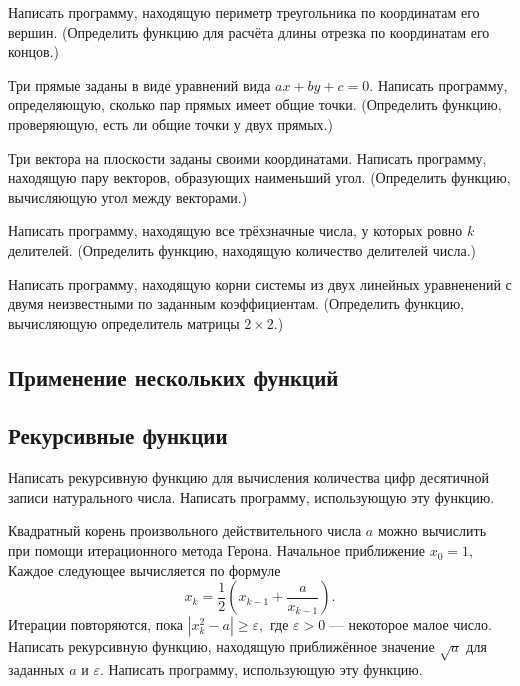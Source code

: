 \task Написать программу, находящую периметр треугольника по
координатам его вершин. (Определить функцию для расчёта длины отрезка
по координатам его концов.)

\task Три прямые заданы в виде уравнений вида $ax+by+c=0$. Написать
программу, определяющую, сколько пар прямых имеет общие
точки. (Определить функцию, проверяющую, есть ли общие точки у двух
прямых.)

\task Три вектора на плоскости заданы своими координатами. Написать
программу, находящую пару векторов, образующих наименьший
угол. (Определить функцию, вычисляющую угол между векторами.)

\task Написать программу, находящую все трёхзначные числа, у которых
ровно $k$ делителей. (Определить функцию, находящую количество
делителей числа.)

\task Написать программу, находящую корни системы из двух линейных
уравненений с двумя неизвестными по заданным
коэффициентам. (Определить функцию, вычисляющую определитель матрицы
$2\times 2$.)

\subsection{Применение нескольких функций}

\task

\task

\task

\task

\task

\task

\task

\task

\task

\task

\subsection{Рекурсивные функции}

\task Написать рекурсивную функцию для вычисления количества цифр
десятичной записи натурального числа. Написать программу, использующую
эту функцию.

\task Квадратный корень произвольного действительного числа $a$ можно
вычислить при помощи итерационного метода Герона. Начальное
приближение $x_0 = 1,$ Каждое следующее вычисляется по формуле
\[
x_k = \frac12 \left( x_{k-1} + \frac{a}{x_{k-1}} \right).
\]
Итерации повторяются, пока $\left| x_k^2 - a \right| \geqslant
\varepsilon,$ где $\varepsilon > 0$ — некоторое малое число.  Написать
рекурсивную функцию, находящую приближённое значение $\sqrt{a}$ для
заданных $a$ и $\varepsilon.$ Написать программу, использующую эту
функцию.

